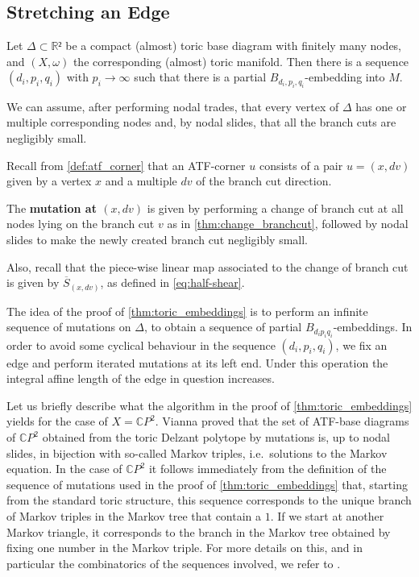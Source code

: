\documentclass[12pt,a4paper,abstract=true,draft]{scrartcl}
\begin{document}
\subsection{Stretching an Edge}
\label{sec:stretch_edge}

\begin{proposition}
  \label{thm:toric_embeddings}
  Let $Δ ⊂ ℝ²$ be a compact (almost) toric base diagram with finitely many nodes, and $(X,ω)$ the corresponding (almost) toric manifold.
  Then there is a sequence $(d_i,p_i,q_i)$ with $p_i → ∞$ such that there is a partial $B_{d_i,p_i,q_i}$-embedding into $M$.
\end{proposition}

We can assume, after performing nodal trades, that every vertex of $Δ$ has one or multiple corresponding nodes and, by nodal slides, that all the branch cuts are negligibly small.

Recall from \cref{def:atf_corner} that an ATF-corner $u$ consists of a pair $u=(x,dv)$ given by a vertex $x$ and a multiple $dv$ of the branch cut direction.

\begin{definition}
  \label{def:mutation_at_atf_corner}
  The \textbf{mutation at $(x,dv)$} is given by performing a change of branch cut at all nodes lying on the branch cut $v$ as in \cref{thm:change_branchcut}, followed by nodal slides to make the newly created branch cut negligibly small.
\end{definition}

Also, recall that the piece-wise linear map associated to the change of branch cut is given by $\overline{S}_{(x,dv)}$, as defined in \eqref{eq:half-shear}.

The idea of the proof of \cref{thm:toric_embeddings} is to perform an infinite sequence of mutations on $Δ$, to obtain a sequence of partial $B_{d_i p_i q_i}$-embeddings.
In order to avoid some cyclical behaviour in the sequence $(d_i,p_i,q_i)$, we fix an edge and perform iterated mutations at its left end.
Under this operation the integral affine length of the edge in question increases.

\begin{remark}
    Let us briefly describe what the algorithm in the proof of \cref{thm:toric_embeddings} yields for the case of $X = \mathbb{C}P^2$.
    Vianna \cite{Via16} proved that the set of ATF-base diagrams of $\mathbb{C}P^2$ obtained from the toric Delzant polytope by mutations is, up to nodal slides, in bijection with so-called Markov triples, i.e.\ solutions to the Markov equation.
  In the case of $\mathbb{C}P^2$ it follows immediately from the definition of the sequence of mutations used in the proof of \cref{thm:toric_embeddings} that, starting from the standard toric structure, this sequence corresponds to the unique branch of Markov triples in the Markov tree that contain a $1$.
    If we start at another Markov triangle, it corresponds to the branch in the Markov tree obtained by fixing one number in the Markov triple.
For more details on this, and in particular the combinatorics of the sequences involved, we refer to \cite[Section~8.4, Appendix~I]{evans2021atfs}.
\end{remark}
\end{document}

